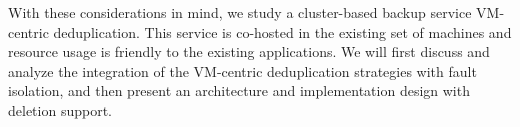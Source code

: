 

%


With these considerations in mind, we study a cluster-based backup service 
VM-centric deduplication. This service is co-hosted   in the existing set of machines and resource usage is friendly
to the existing applications.  
We will first discuss and analyze the integration of the VM-centric deduplication strategies with fault isolation, and then present
an architecture and implementation design with deletion support.

